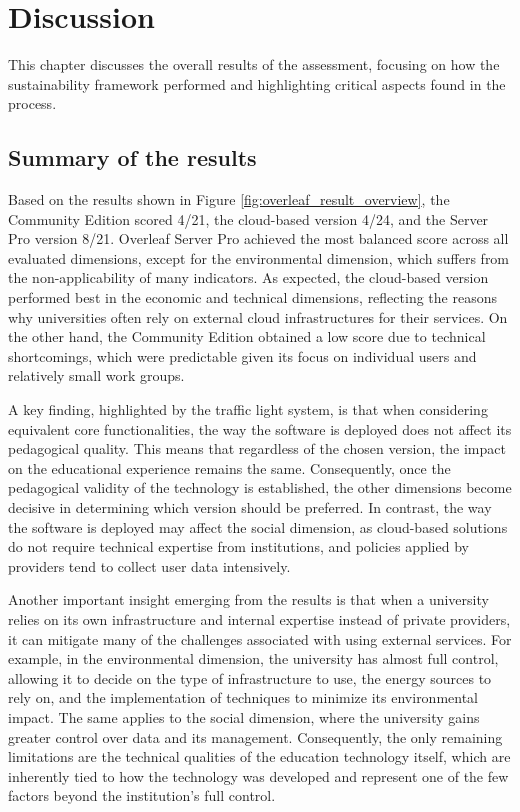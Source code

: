 \chapter{Discussion}
\label{cha:5_discussion}
This chapter discusses the overall results of the assessment, focusing on how the sustainability framework performed and highlighting critical aspects found in the process.     

\section{Summary of the results}
\label{sec:summary_result}
Based on the results shown in Figure \ref{fig:overleaf_result_overview}, the Community Edition scored 4/21, the cloud-based version 4/24, and the Server Pro version 8/21. Overleaf Server Pro achieved the most balanced score across all evaluated dimensions, except for the environmental dimension, which suffers from the non-applicability of many indicators. As expected, the cloud-based version performed best in the economic and technical dimensions, reflecting the reasons why universities often rely on external cloud infrastructures for their services. On the other hand, the Community Edition obtained a low score due to technical shortcomings, which were predictable given its focus on individual users and relatively small work groups.

A key finding, highlighted by the traffic light system, is that when considering equivalent core functionalities, the way the software is deployed does not affect its pedagogical quality. This means that regardless of the chosen version, the impact on the educational experience remains the same. Consequently, once the pedagogical validity of the technology is established, the other dimensions become decisive in determining which version should be preferred. In contrast, the way the software is deployed may affect the social dimension, as cloud-based solutions do not require technical expertise from institutions, and policies applied by providers tend to collect user data intensively.

Another important insight emerging from the results is that when a university relies on its own infrastructure and internal expertise instead of private providers, it can mitigate many of the challenges associated with using external services. For example, in the environmental dimension, the university has almost full control, allowing it to decide on the type of infrastructure to use, the energy sources to rely on, and the implementation of techniques to minimize its environmental impact. The same applies to the social dimension, where the university gains greater control over data and its management. Consequently, the only remaining limitations are the technical qualities of the education technology itself, which are inherently tied to how the technology was developed and represent one of the few factors beyond the institution’s full control.

